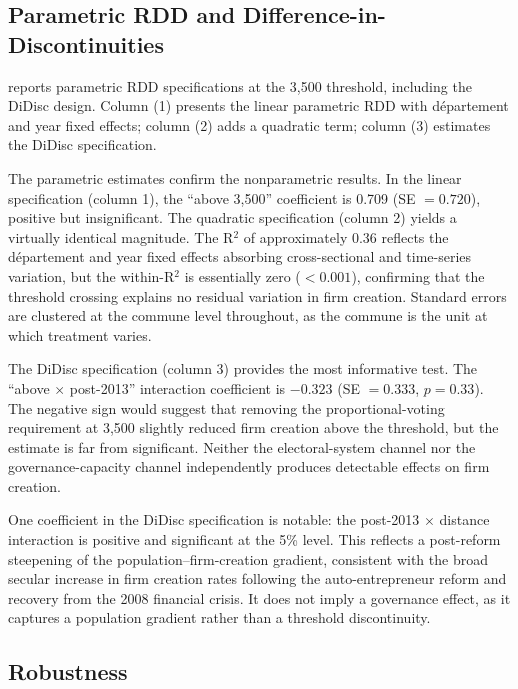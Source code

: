 \documentclass[12pt]{article}
\begin{document}
\subsection{Parametric RDD and Difference-in-Discontinuities}

 reports parametric RDD specifications at the 3,500 threshold, including the DiDisc design. Column (1) presents the linear parametric RDD with d\'{e}partement and year fixed effects; column (2) adds a quadratic term; column (3) estimates the DiDisc specification.



The parametric estimates confirm the nonparametric results. In the linear specification (column 1), the ``above 3,500'' coefficient is 0.709 (SE $= 0.720$), positive but insignificant. The quadratic specification (column 2) yields a virtually identical magnitude. The R$^2$ of approximately 0.36 reflects the d\'{e}partement and year fixed effects absorbing cross-sectional and time-series variation, but the within-R$^2$ is essentially zero ($< 0.001$), confirming that the threshold crossing explains no residual variation in firm creation. Standard errors are clustered at the commune level throughout, as the commune is the unit at which treatment varies.

The DiDisc specification (column 3) provides the most informative test. The ``above $\times$ post-2013'' interaction coefficient is $-0.323$ (SE $= 0.333$, $p = 0.33$). The negative sign would suggest that removing the proportional-voting requirement at 3,500 slightly reduced firm creation above the threshold, but the estimate is far from significant. Neither the electoral-system channel nor the governance-capacity channel independently produces detectable effects on firm creation.

One coefficient in the DiDisc specification is notable: the post-2013 $\times$ distance interaction is positive and significant at the 5\% level. This reflects a post-reform steepening of the population--firm-creation gradient, consistent with the broad secular increase in firm creation rates following the auto-entrepreneur reform and recovery from the 2008 financial crisis. It does not imply a governance effect, as it captures a population gradient rather than a threshold discontinuity.

\subsection{Robustness}
\end{document}
